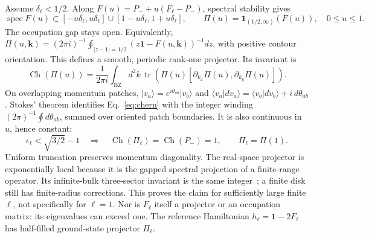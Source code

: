 \documentclass[aps,prb,onecolumn,nofootinbib,superscriptaddress]{revtex4-2}
\newcommand{\Id}{\mathbf{1}}
\newcommand{\Ch}{\operatorname{Ch}}
\newcommand{\tr}{\operatorname{tr}}
\newcommand{\bk}{\boldsymbol k}
\newcommand{\ket}[1]{\lvert#1\rangle}
\newcommand{\bra}[1]{\langle#1\rvert}
\begin{document}
Assume $\delta_\ell<1/2$. Along $F(u)=P_-+u(F_\ell-P_-)$, spectral stability gives
\begin{equation}
 \operatorname{spec}F(u)\subset[-u\delta_\ell,u\delta_\ell]
 \cup[1-u\delta_\ell,1+u\delta_\ell],\qquad
 \Pi(u)=\mathbf1_{(1/2,\infty)}(F(u)),\quad 0\le u\le1. \label{eq:path}
\end{equation}
The occupation gap stays open. Equivalently,
$\Pi(u,\bk)=(2\pi i)^{-1}\oint_{|z-1|=1/2}(z\Id-F(u,\bk))^{-1}dz$,
with positive contour orientation. This defines a smooth, periodic rank-one
projector. Its invariant is
\begin{equation}
 \Ch(\Pi(u))=\frac1{2\pi i}\int_{\mathrm{BZ}}d^2k\,
 \tr\!\left(\Pi(u)[\partial_{k_x}\Pi(u),\partial_{k_y}\Pi(u)]\right).
 \label{eq:chern}
\end{equation}
On overlapping momentum patches, $\ket{v_a}=e^{i\theta_{ab}}\ket{v_b}$ and
$\bra{v_a}d v_a\rangle=\bra{v_b}d v_b\rangle+i\,d\theta_{ab}$.
Stokes' theorem identifies Eq.~\eqref{eq:chern} with the integer winding
$(2\pi)^{-1}\oint d\theta_{ab}$, summed over oriented patch boundaries.
It is also continuous in $u$, hence constant:
\begin{equation}
 \boxed{\epsilon_\ell<\sqrt{3/2}-1\quad\Longrightarrow\quad
 \Ch(\Pi_\ell)=\Ch(P_-)=1,\qquad \Pi_\ell=\Pi(1).} \label{eq:claim}
\end{equation}
Uniform truncation preserves momentum diagonality. The real-space projector
is exponentially local because it is the gapped spectral projection of a
finite-range operator. Its infinite-bulk three-sector invariant is the same
integer~\cite{Kitaev}; a finite disk still has finite-radius corrections.
This proves the claim for sufficiently large finite $\ell$, not specifically
for $\ell=1$. Nor is $F_\ell$ itself a projector or an occupation matrix:
its eigenvalues can exceed one. The reference Hamiltonian
$h_\ell=\Id-2F_\ell$ has half-filled ground-state projector $\Pi_\ell$.
\end{document}
